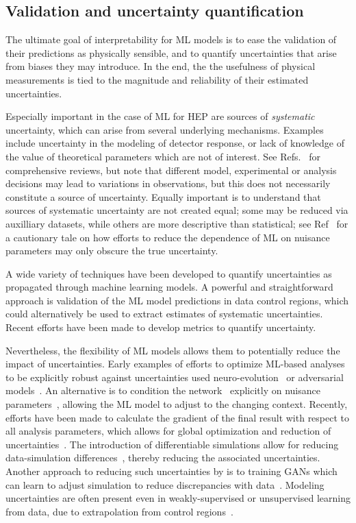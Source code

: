 \documentclass[submission,Phys]{SciPost}
\begin{document}
\subsection{Validation and uncertainty quantification}

The ultimate goal of interpretability for ML models is to ease the validation of their predictions as physically sensible, and to quantify uncertainties that arise from biases they may introduce.  In the end, the the usefulness of physical measurements is tied to the magnitude and reliability of their estimated uncertainties.

Especially important in the case of ML for HEP are sources of {\it systematic} uncertainty, which can arise from several underlying mechanisms. Examples include uncertainty in the modeling of detector response, or lack of knowledge of the value of theoretical parameters which are not of interest. See Refs.~\cite{Nachman:2019dol,Dorigo:2020ldg} for comprehensive reviews, but note that different model, experimental or analysis decisions may lead to variations in observations, but this does not necessarily constitute a source of uncertainty. Equally important is to understand that sources of systematic uncertainty are not created equal; some may be reduced via auxilliary datasets, while others are more descriptive than statistical; see Ref~\cite{Ghosh:2021hrh} for a cautionary tale on how efforts to reduce the dependence of ML on nuisance parameters may only obscure the true uncertainty.

A wide variety of techniques have been developed to quantify uncertainties as propagated through machine learning models. A powerful and straightforward approach is validation of the ML model predictions in data control regions, which could alternatively be used to extract estimates of systematic uncertainties. Recent efforts have been made to develop metrics to quantify uncertainty\cite{Viren:2022qon}.

Nevertheless, the flexibility of ML models allows them to potentially reduce the impact of uncertainties. Early examples of efforts to optimize ML-based analyses to be explicitly robust against uncertainties used neuro-evolution~\cite{CDF:2008dvp} or adversarial models~\cite{Louppe:2016ylz,Shimmin:2017mfk}. An alternative is to condition the network~\cite{Baldi:2016fzo} explicitly on nuisance parameters~\cite{Ghosh:2021roe}, allowing the ML model to adjust to the changing context. Recently, efforts have been made to calculate the gradient of the final result with respect to all analysis parameters, which allows for global optimization and reduction of uncertainties~\cite{DeCastro:2018psv}.  The introduction of differentiable simulations  allow for reducing  data-simulation differences~\cite{Viren:2022qon}, thereby reducing the associated uncertainties.  Another approach to reducing such uncertainties by is to training GANs which can learn to adjust simulation to reduce discrepancies with data~\cite{Viren:2022qon}. Modeling uncertainties are often present even in weakly-supervised or unsupervised learning from data, due to extrapolation from control regions~\cite{Metodiev:2017vrx}.
\end{document}
